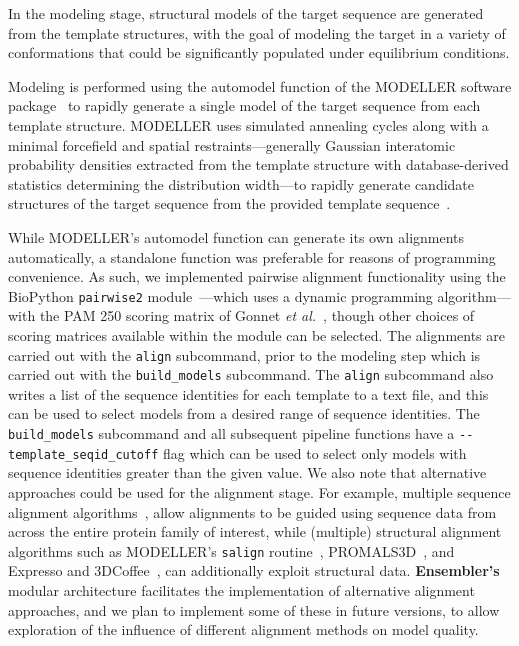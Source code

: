 \documentclass[10pt,letterpaper]{article}
\begin{document}
In the modeling stage, structural models of the target sequence are generated from the template structures, with the goal of modeling the target in a variety of conformations that could be significantly populated under equilibrium conditions.

Modeling is performed using the automodel function of the MODELLER software package~\cite{fiser:prot-sci:2000:modeller,sali:jmb:1993:modeller} to rapidly generate a single model of the target sequence from each template structure.
MODELLER uses simulated annealing cycles along with a minimal forcefield and spatial restraints---generally Gaussian interatomic probability densities extracted from the template structure with database-derived statistics determining the distribution width---to rapidly generate candidate structures of the target sequence from the provided template sequence~\cite{fiser:prot-sci:2000:modeller,sali:jmb:1993:modeller}.

While MODELLER's automodel function can generate its own alignments automatically, a standalone function was preferable for reasons of programming convenience.
As such, we implemented pairwise alignment functionality using the BioPython {\tt pairwise2} module~\cite{cock:2009:biopython}---which uses a dynamic programming algorithm---with the PAM 250 scoring matrix of Gonnet \textit{et al.}~\cite{gonnet:science:1992:exhaustive-matching}, though other choices of scoring matrices available within the module can be selected.
The alignments are carried out with the {\tt align} subcommand, prior to the modeling step which is carried out with the {\tt build\_models} subcommand.
The {\tt align} subcommand also writes a list of the sequence identities for each template to a text file, and this can be used to select models from a desired range of sequence identities.
The {\tt build\_models} subcommand and all subsequent pipeline functions have a {\tt -{}-template\_seqid\_cutoff} flag which can be used to select only models with sequence identities greater than the given value.
We also note that alternative approaches could be used for the alignment stage.
For example, multiple sequence alignment algorithms~\cite{thompson:2011:msa-review}, allow alignments to be guided using sequence data from across the entire protein family of interest, while (multiple) structural alignment algorithms such as MODELLER's {\tt salign} routine~\cite{fiser:prot-sci:2000:modeller,sali:jmb:1993:modeller}, PROMALS3D~\cite{pei:2008:promals3d}, and Expresso and 3DCoffee~\cite{expresso,3dcoffee}, can additionally exploit structural data.
{\bf Ensembler's} modular architecture facilitates the implementation of alternative alignment approaches, and we plan to implement some of these in future versions, to allow exploration of the influence of different alignment methods on model quality.
\end{document}
